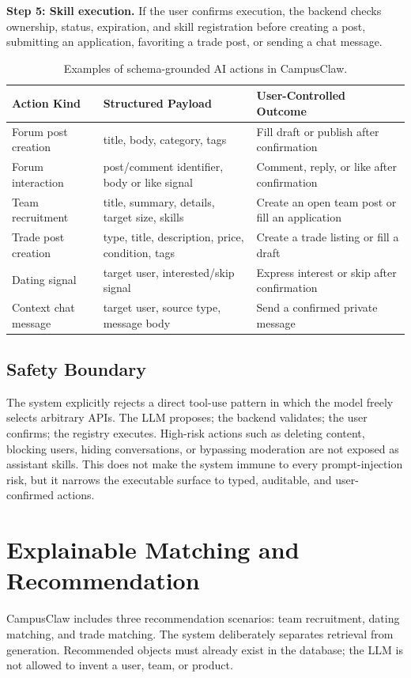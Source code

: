 \documentclass[twocolumn]{article}
\begin{document}
\textbf{Step 5: Skill execution.} If the user confirms execution, the backend checks ownership, status, expiration, and skill registration before creating a post, submitting an application, favoriting a trade post, or sending a chat message.

\begin{table}[t]
\centering
\caption{Examples of schema-grounded AI actions in CampusClaw.}
\label{tab:actions}
\begin{tabularx}{\textwidth}{lX X}
\toprule
\textbf{Action Kind} & \textbf{Structured Payload} & \textbf{User-Controlled Outcome}\\
\midrule
Forum post creation & title, body, category, tags & Fill draft or publish after confirmation\\
Forum interaction & post/comment identifier, body or like signal & Comment, reply, or like after confirmation\\
Team recruitment & title, summary, details, target size, skills & Create an open team post or fill an application\\
Trade post creation & type, title, description, price, condition, tags & Create a trade listing or fill a draft\\
Dating signal & target user, interested/skip signal & Express interest or skip after confirmation\\
Context chat message & target user, source type, message body & Send a confirmed private message\\
\bottomrule
\end{tabularx}
\end{table}

\subsection{Safety Boundary}
The system explicitly rejects a direct tool-use pattern in which the model freely selects arbitrary APIs. The LLM proposes; the backend validates; the user confirms; the registry executes. High-risk actions such as deleting content, blocking users, hiding conversations, or bypassing moderation are not exposed as assistant skills. This does not make the system immune to every prompt-injection risk, but it narrows the executable surface to typed, auditable, and user-confirmed actions.

\section{Explainable Matching and Recommendation}
CampusClaw includes three recommendation scenarios: team recruitment, dating matching, and trade matching. The system deliberately separates retrieval from generation. Recommended objects must already exist in the database; the LLM is not allowed to invent a user, team, or product.
\end{document}
